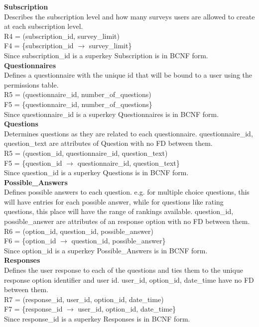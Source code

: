 \documentclass[12pt, oneside, a4paper]{article}
\newcommand{\tb}[1]{\textbf{#1}}
\begin{document}
    \tb{Subscription} \\
    Describes the subscription level and how many surveys users are allowed to create at each subscription level. \\
    R4 = (subscription\_id, survey\_limit) \\
    F4 = \{subscription\_id \(\rightarrow\) survey\_limit\} \\
    Since subscription\_id is a superkey Subscription is in BCNF form. 
    \\

    \tb{Questionnaires} \\
    Defines a questionnaire with the unique id that will be bound to a user using the permissions table. \\
    R5 = (questionnaire\_id, number\_of\_questions) \\
    F5 = \{questionnaire\_id, number\_of\_questions\} \\ 
    Since questionnaire\_id is a superkey Questionnaires is in BCNF form. 
    \\

    \tb{Questions} \\
    Determines questions as they are related to each questionnaire. questionnaire\_id, question\_text are attributes of Question with no FD between them. \\
    R5 = (question\_id, questionnaire\_id, question\_text) \\
    F5 = \{question\_id \(\rightarrow\) questionnaire\_id, question\_text\} \\
    Since question\_id is a superkey Questions is in BCNF form. 
    \\

    \tb{Possible\_Answers} \\
    Defines possible answers to each question. e.g. for multiple choice questions, this will have entries for each possible answer, while for questions like rating questions, this place will have the range of rankings available. question\_id, possible\_answer are attributes of an response option with no FD between them. \\
    R6 = (option\_id, question\_id, possible\_answer) \\
    F6 = \{option\_id \(\rightarrow\) question\_id, possible\_answer\} \\
    Since option\_id is a superkey Possible\_Answers is in BCNF form. 
    \\

    \tb{Responses} \\
    Defines the user response to each of the questions and ties them to the unique response option identifier and user id. user\_id, option\_id, date\_time have no FD between them. \\
    R7 = (response\_id, user\_id, option\_id, date\_time) \\
    F7 = \{response\_id $\rightarrow$ user\_id, option\_id, date\_time\} \\
    Since response\_id is a superkey Responses is in BCNF form. 
    \\
\end{document}
